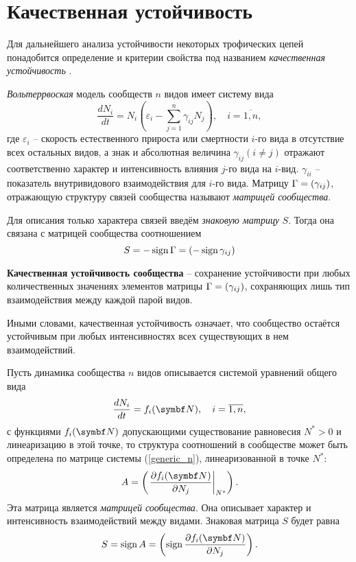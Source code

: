 \section{Качественная устойчивость}
    Для дальнейшего анализа устойчивости некоторых трофических цепей понадобится определение и критерии свойства под названием \textit{качественная устойчивость} \cite{svilog}.

    \textit{Вольтеррвоская} модель сообществ \(n\) видов имеет систему вида
    \begin{equation}
        \frac{d N_i}{d t} = N_i \left( \varepsilon_i - \sum_{j=1}^{n} \gamma_{ij} N_j \right), \quad i=\overline{1,n},
    \end{equation}
    где \(\varepsilon_i\) -- скорость естественного прироста или смертности \(i\)-го вида в отсутствие всех остальных видов, а знак и абсолютная величина \(\gamma_{ij} (i \neq j)\) отражают соответственно характер и интенсивность влияния \(j\)-го вида на \(i\)-вид. \(\gamma_{ii}\) -- показатель внутривидового взаимодействия для \(i\)-го вида. Матрицу \(\Gamma = \left(  \gamma_{ij}  \right) \), отражающую структуру связей сообщества называют \textit{матрицей сообщества}.

    Для описания только характера связей введём \textit{знаковую матрицу} \(S\). Тогда она связана с матрицей сообщества соотношением 
    \[
        S = -\operatorname{sign} \Gamma = \left(  - \operatorname{sign} \gamma_{ij}  \right)
    \]

    \begin{definition}
        \textbf{Качественная устойчивость сообщества} -- сохранение устойчивости при любых количественных значениях элементов матрицы \(\Gamma = \left(  \gamma_{ij}  \right)\), сохраняющих лишь тип взаимодействия между каждой парой видов.
    \end{definition}

    Иными словами, качественная устойчивость означает, что сообщество остаётся устойчивым при любых интенсивностях  всех существующих в нем взаимодействий.

    Пусть динамика сообщества \(n\) видов описывается системой уравнений общего вида
    \begin{equation} \label{generic_n}
        \frac{d N_i}{d t} = f_i( \mb{N} ), \quad i = \overline{1,n},
    \end{equation}
    с функциями \(f_i ( \mb{N} )\) допускающими существование равновесия \(N^* > 0\) и линеаризацию в этой точке, то структура соотношений в сообществе может быть определена по матрице системы (\ref{generic_n}), линеаризованной в точке \(N^*\):
    \begin{equation}
        A = \pares{ \left. \frac{\D f_i ( \mb{N} )}{\D N_j} \right|_{N^*} }.
    \end{equation}
    Эта матрица является \textit{матрицей сообщества}. Она описывает характер и интенсивность взаимодействий между видами. Знаковая матрица \(S\) будет равна
    \begin{equation} \label{sign_partial}
        S = \sign A = \pares{ \sign \frac{\D f_i ( \mb{N} )}{\D N_j} }.
    \end{equation}

